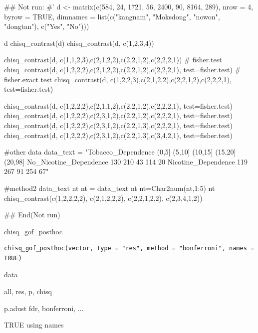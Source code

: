 \documentclass[a4paper]{book}
\begin{document}
\begin{Examples}
\begin{ExampleCode}

\#\# Not run: 
#'
d <- matrix(c(584, 24, 1721, 56, 2400, 90, 8164, 289),
            nrow = 4, byrow = TRUE,
            dimnames = list(c("kangnam", "Moksdong", "nowon", "dongtan"), c("Yes", "No")))

d%
chisq_contrast(d)
chisq_contrast(d, c(1,2,3,4))


chisq_contrast(d, c(1,1,2,3),c(2,1,2,2),c(2,2,1,2),c(2,2,2,1))
# fisher.test
chisq_contrast(d, c(1,2,2,2),c(2,1,2,2),c(2,2,1,2),c(2,2,2,1), test=fisher.test)
# fisher.exact test
chisq_contrast(d, c(1,2,2,3),c(2,1,2,2),c(2,2,1,2),c(2,2,2,1), test=fisher.test)

chisq_contrast(d, c(1,2,2,2),c(2,1,1,2),c(2,2,1,2),c(2,2,2,1), test=fisher.test)
chisq_contrast(d, c(1,2,2,2),c(2,3,1,2),c(2,2,1,2),c(2,2,2,1), test=fisher.test)
chisq_contrast(d, c(1,2,2,2),c(2,3,1,2),c(2,2,1,3),c(2,2,2,1), test=fisher.test)
chisq_contrast(d, c(1,2,2,2),c(2,3,1,2),c(2,2,1,3),c(3,4,2,1), test=fisher.test)


#other data
data_text = "Tobacco_Dependence (0,5] (5,10] (10,15] (15,20] (20,98]
No_Nicotine_Dependence 130 210 43 114 20
Nicotine_Dependence 119 267 91 254 67"

#method2
data_text%
nt
nt = data_text%
nt %
nt=Char2num(nt,1:5)
nt%
  chisq_contrast(c(1,2,2,2,2),
                 c(2,1,2,2,2),
                 c(2,2,1,2,2),
                 c(2,3,4,1,2))

## End(Not run)


\end{ExampleCode}
\end{Examples}
%
\begin{Description}
chisq\_gof\_posthoc
\end{Description}
%
\begin{Usage}
\begin{verbatim}
chisq_gof_posthoc(vector, type = "res", method = "bonferroni", names = TRUE)
\end{verbatim}
\end{Usage}
%
\begin{Arguments}
\begin{ldescription}
\item[\code{vector}] data

\item[\code{type}] all, res, p, chisq

\item[\code{method}] p.adust fdr, bonferroni, ...

\item[\code{names}] TRUE using names
\end{ldescription}
\end{Arguments}
\end{document}
